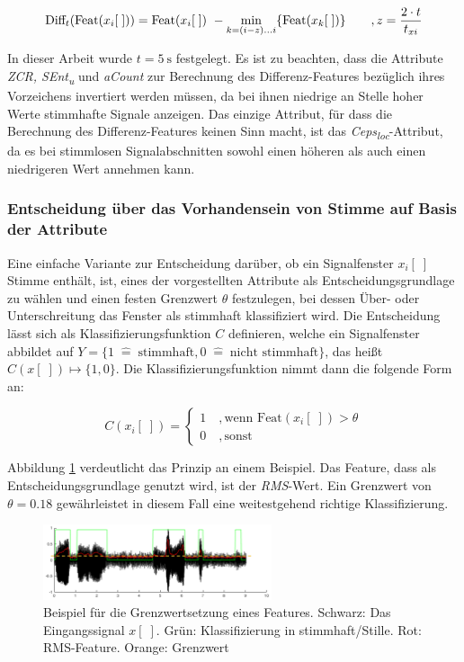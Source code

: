 \begin{equation}
\text{Diff}_t(\text{Feat}(x_i[\;])) = \text{Feat}(x_i[\;])\ - \operatorname*{min}_{k=(i-z)...i}\{\text{Feat}(x_k[\;])\} \qquad , z = \frac{2 \cdot t}{t_{xi}}
\label{eq:difFeature}
\end{equation}

In dieser Arbeit wurde $t = \SI{5}{\second}$ festgelegt. Es ist zu beachten, dass die Attribute \emph{ZCR, SEnt\textsubscript{u}} und \emph{aCount} zur Berechnung des Differenz-Features bezüglich ihres Vorzeichens invertiert werden müssen, da bei ihnen niedrige an Stelle hoher Werte stimmhafte Signale anzeigen. Das einzige Attribut, für dass die Berechnung des Differenz-Features keinen Sinn macht, ist das \emph{Ceps\textsubscript{loc}}-Attribut, da es bei stimmlosen Signalabschnitten sowohl einen höheren als auch einen niedrigeren Wert annehmen kann.

\subsubsection{Entscheidung über das Vorhandensein von Stimme auf Basis der Attribute}

Eine einfache Variante zur Entscheidung darüber, ob ein Signalfenster $x_i[\;]$ Stimme enthält, ist, eines der vorgestellten Attribute als Entscheidungsgrundlage zu wählen und einen festen Grenzwert $\theta$ festzulegen, bei dessen Über- oder Unterschreitung das Fenster als stimmhaft klassifiziert wird. Die Entscheidung lässt sich als Klassifizierungsfunktion $C$ definieren, welche ein Signalfenster abbildet auf $Y = \{ 1 \; \hat{=} \; \text{stimmhaft}, 0 \; \hat{=} \; \text{nicht stimmhaft}\}$, das heißt $C(x[\;]) \mapsto \{1,0\}$. Die Klassifizierungsfunktion nimmt dann die folgende Form an:

\begin{equation}
	C(x_i[\;]) = 
\begin{cases}
1 \quad , \text{wenn Feat}(x_i[\;]) > \theta \\
0 \quad , \text{sonst}
 \end{cases}
\end{equation}

 Abbildung \ref{img:thresholded} verdeutlicht das Prinzip an einem Beispiel. Das Feature, dass als Entscheidungsgrundlage genutzt wird, ist der \emph{RMS}-Wert. Ein Grenzwert von $\theta = 0.18$ gewährleistet in diesem Fall eine weitestgehend richtige Klassifizierung.

\begin{figure}[h]
	\centering
	\includegraphics[width=0.6\textwidth]{bilder/thresholded02.png}
	\caption[Beispiel für die Grenzwertsetzung eines Features]{Beispiel für die Grenzwertsetzung eines Features. Schwarz: Das Eingangssignal $x[\;]$. Grün: Klassifizierung in stimmhaft/Stille. Rot: RMS-Feature. Orange: Grenzwert}
	\label{img:thresholded}
\end{figure}

